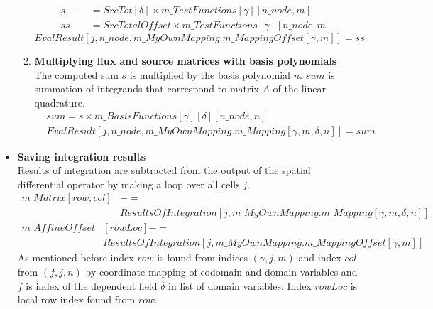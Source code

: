 \documentclass[BoSSSForSolvingConservationLaws.tex]{subfiles}
\begin{document}
\begin{itemize}
\begin{enumerate}
\begin{align*}
s-&=SrcTot[\delta] \times m\_TestFunctions[\gamma][n\_node, m]\\
ss-&=SrcTotalOffset \times m\_TestFunctions[\gamma][n\_node, m]
\end{align*}
\[
EvalResult[j, n\_node, m\_MyOwnMapping.m\_MappingOffset[\gamma, m]] = ss
\]
\item \textbf{Multiplying flux and source matrices with basis polynomials}\\
\label{EndOfLoopVolume}
The computed sum $s$ is multiplied by the basis polynomial $n$. $sum$ is summation of integrands that correspond to matrix $A$ of the linear quadrature.
\begin{align*}
&sum=s \times m\_BasisFunctions[\gamma][\delta][n\_node,n]\\
&EvalResult[j, n\_node, m\_MyOwnMapping.m\_Mapping[\gamma, m, \delta, n]]=sum
\end{align*}
\end{enumerate}
\item \textbf{Saving integration results}\\
Results of integration are subtracted from the output of the spatial differential operator by making a loop over all cells $j$.
\begin{align*}
m\_Matrix[row,col]& -=\\
&ResultsOfIntegration[j,m\_MyOwnMapping.m\_Mapping[\gamma,m,\delta,n]]
\end{align*}
\begin{align*}
m\_AffineOffset&[rowLoc] -=\\
&ResultsOfIntegration[j, m\_MyOwnMapping.m\_MappingOffset[\gamma, m]]
\end{align*}
As mentioned before index $row$ is found from indices $(\gamma,j,m)$ and index $col$ from $(f,j,n)$ by coordinate mapping of codomain and domain variables and $f$ is index of the dependent field $\delta$ in list of domain variables. Index $rowLoc$ is local row index found from $row$.
\end{itemize}

\newpage
\end{document}
